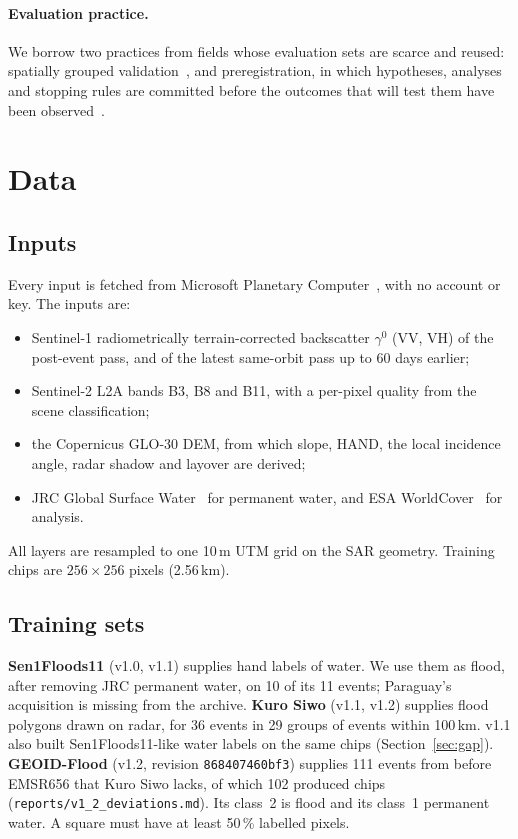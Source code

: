 \documentclass[10pt,twocolumn,a4paper]{article}
\newcommand{\file}[1]{\nolinkurl{#1}}
\newcommand{\pp}{\,\%}
\begin{document}
\paragraph{Evaluation practice.} We borrow two practices from fields whose evaluation sets are scarce and reused:
spatially grouped validation~\citep{roberts2017cv,meyer2022maps}, and preregistration, in which hypotheses, analyses
and stopping rules are committed before the outcomes that will test them have been observed~\citep{nosek2018prereg}.

\section{Data}\label{sec:data}

\subsection{Inputs}
Every input is fetched from Microsoft Planetary Computer~\citep{planetarycomputer2022}, with no account or key. The
inputs are:
\begin{itemize}
  \item Sentinel-1 radiometrically terrain-corrected backscatter $\gamma^0$ (VV, VH) of the post-event pass, and of
    the latest same-orbit pass up to 60 days earlier;
  \item Sentinel-2 L2A bands B3, B8 and B11, with a per-pixel quality from the scene classification;
  \item the Copernicus GLO-30 DEM, from which slope, HAND, the local incidence angle, radar shadow and layover are
    derived;
  \item JRC Global Surface Water~\citep{pekel2016gsw} for permanent water, and ESA WorldCover~\citep{zanaga2022worldcover}
    for analysis.
\end{itemize}
All layers are resampled to one 10\,m UTM grid on the SAR geometry. Training chips are $256\times256$ pixels
(2.56\,km).

\subsection{Training sets}
\textbf{Sen1Floods11} (v1.0, v1.1) supplies hand labels of water. We use them as flood, after removing JRC permanent
water, on 10 of its 11 events; Paraguay's acquisition is missing from the archive. \textbf{Kuro Siwo} (v1.1, v1.2)
supplies flood polygons drawn on radar, for 36 events in 29 groups of events within 100\,km. v1.1 also built
Sen1Floods11-like water labels on the same chips (Section~\ref{sec:gap}). \textbf{GEOID-Flood} (v1.2, revision
\texttt{868407460bf3}) supplies 111 events from before EMSR656 that Kuro Siwo lacks, of which 102 produced chips
(\file{reports/v1_2_deviations.md}). Its class~2 is flood and its class~1 permanent water. A square must have at least
50\pp{} labelled pixels.
\end{document}
